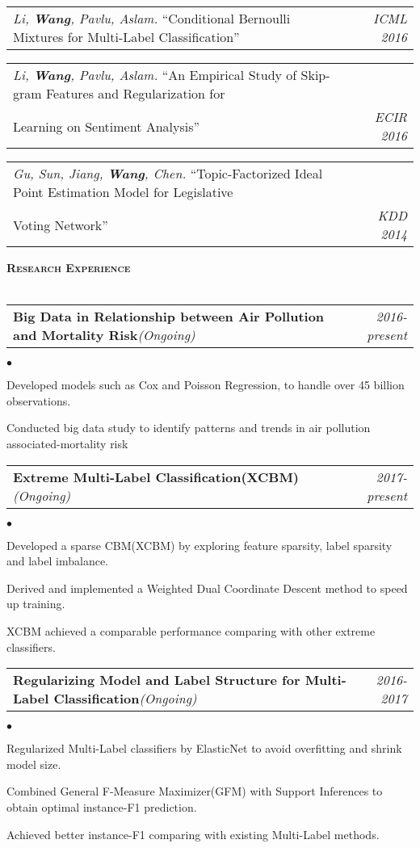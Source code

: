\documentclass[11pt]{article}
\makeatletter
\newcommand{\lineunder}{\vspace*{-8pt} \\ \hspace*{-18pt} \hrulefill \\}
\newcommand{\header}[1]{{\hspace*{-15pt}\vspace*{6pt} \large \textsc{\textbf{#1}}} \vspace*{-6pt} \lineunder}
\newenvironment{achievements}{\begin{list}{$\bullet$}{\topsep 0pt \itemsep -2pt}}{\vspace*{4pt}\end{list}}
\newcommand{\headerrow}[2]
{\begin{tabular*}{\linewidth}{l@{\extracolsep{\fill}}r}
	\hspace*{-15pt}#1 & #2 \\
\end{tabular*}}
\newcommand{\headerrowww}[1]
{\begin{tabular*}{\linewidth}{l@{\extracolsep{\fill}}r}
	#1 &\\
\end{tabular*}}
\makeatother
\begin{document}
\headerrow
{\textit{Li, \textbf{Wang}, Pavlu, Aslam.} ``Conditional Bernoulli Mixtures for Multi-Label Classification''}
{\emph{ICML 2016}}

\headerrow
{\textit{Li, \textbf{Wang}, Pavlu, Aslam.} ``An Empirical Study of Skip-gram Features and Regularization for \\Learning on Sentiment Analysis''}
{\emph{ECIR 2016}}

\headerrow
{\textit{Gu, Sun, Jiang, \textbf{Wang}, Chen.} ``Topic-Factorized Ideal Point Estimation Model for Legislative \\ Voting Network''}
{\emph{KDD 2014}}


\vspace*{1.5pt}
\header{Research Experience}

\headerrow
{\textbf{Big Data in Relationship between Air Pollution and Mortality Risk}\emph{(Ongoing)}}
{\emph{2016-present}}
\begin{achievements}
	\item Developed models such as Cox and Poisson Regression, to handle over 45 billion observations.
	\item Conducted big data study to identify patterns and trends in air pollution associated-mortality risk
\end{achievements}

\headerrow
{\textbf{Extreme Multi-Label Classification(XCBM)}\emph{(Ongoing)}}
{\emph{2017-present}}
\begin{achievements}
	\item Developed a sparse CBM(XCBM) by exploring feature sparsity, label sparsity and label imbalance. 
	\item Derived and implemented a Weighted Dual Coordinate Descent method to speed up training.
	\item XCBM achieved a comparable performance comparing with other extreme classifiers.
\end{achievements}

\headerrow
{\textbf{Regularizing Model and Label Structure for Multi-Label Classification}\emph{(Ongoing)}}
{\emph{2016-2017}}
\begin{achievements}
	\item Regularized Multi-Label classifiers by ElasticNet to avoid overfitting and shrink model size.
	\item Combined General F-Measure Maximizer(GFM) with Support Inferences to obtain optimal instance-F1 prediction.
	\item Achieved better instance-F1 comparing with existing Multi-Label methods. 
\end{achievements}
\end{document}
